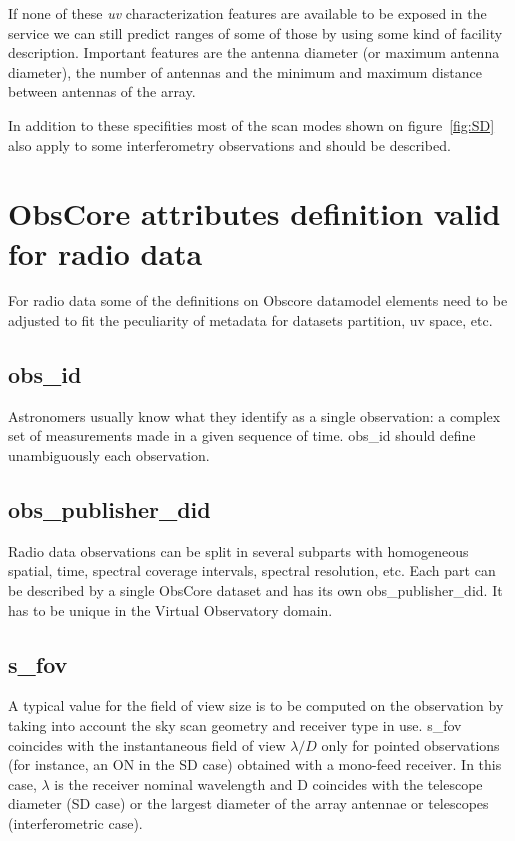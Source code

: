 \documentclass[11pt,a4paper]{ivoa}
\begin{document}
If none of these \emph{uv} characterization features are available to be exposed in the service
we can still predict ranges of some of those by using some kind of facility description.
Important features are the antenna diameter (or maximum antenna diameter), the number of
antennas and the minimum and maximum distance between antennas of the array.

In addition to these specifities most of the scan modes shown on figure~\ref{fig:SD} also
apply to some interferometry observations and should be described.

\section{ObsCore attributes definition valid for radio data}
\label{sec:ObsCoreRadDef}

For radio data some of the definitions on Obscore datamodel elements need to be adjusted
to fit the peculiarity of metadata for datasets partition, uv space, etc.

\subsection{obs\_id}

Astronomers usually know what they identify as a single observation: a complex set of
measurements made in a given sequence of time. obs\_id should define unambiguously each
observation.

\subsection{obs\_publisher\_did}

Radio data observations can be split in several subparts with homogeneous spatial,
time, spectral coverage intervals, spectral resolution, etc. Each part can be described by
a single ObsCore dataset and has its own obs\_publisher\_did. It has to be unique in the
Virtual Observatory domain.

\subsection{s\_fov}
\label{sec:fov}

A typical value for the field of view size is to be computed on the observation by taking into account the sky scan geometry and receiver type in use.
s\_fov coincides with the instantaneous field of view $\lambda / D$ only for pointed observations (for instance, an ON in the SD case) obtained with a mono-feed receiver. In this case, $\lambda$ is the
receiver nominal wavelength and D coincides with the telescope diameter (SD case) or the largest diameter of the array antennae or telescopes (interferometric case).
\end{document}
